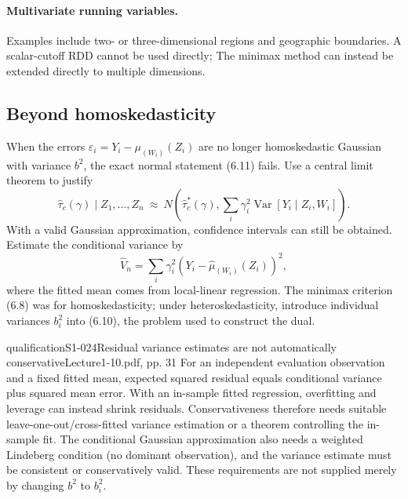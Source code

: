 \paragraph{Multivariate running variables.}
Examples include two- or three-dimensional regions and geographic boundaries. A scalar-cutoff RDD cannot be used directly;  The minimax method can instead be extended directly to multiple dimensions.
\subsection{Beyond homoskedasticity}
When the errors $\varepsilon_i=Y_i-\mu_{(W_i)}(Z_i)$ are no longer homoskedastic Gaussian with variance $b^2$, the exact normal statement (6.11) fails. Use a central limit theorem to justify
\[
\widehat\tau_c(\gamma)\mid Z_1,\ldots,Z_n
\ \approx\ N\left(\widehat\tau_c^*(\gamma),
\sum_i\gamma_i^2\operatorname{Var}[Y_i\mid Z_i,W_i]\right).
\tag{6.14 in the notes}
\]
With a valid Gaussian approximation, confidence intervals can still be obtained. Estimate the conditional variance by
\[
\widehat V_n=\sum_i\gamma_i^2(Y_i-\widehat\mu_{(W_i)}(Z_i))^2,
\]
where the fitted mean comes from local-linear regression.
  The minimax criterion (6.8) was for homoskedasticity; under heteroskedasticity, introduce individual variances $b_i^2$ into (6.10), the problem used to construct the dual.
\begin{reviewnote}{qualification}{S1-024}{Residual variance estimates are not automatically conservative}{Lecture1-10.pdf, pp. 31}
For an independent evaluation observation and a fixed fitted mean, expected squared residual equals conditional variance plus squared mean error. With an in-sample fitted regression, overfitting and leverage can instead shrink residuals. Conservativeness therefore needs suitable leave-one-out/cross-fitted variance estimation or a theorem controlling the in-sample fit. The conditional Gaussian approximation also needs a weighted Lindeberg condition (no dominant observation), and the variance estimate must be consistent or conservatively valid. These requirements are not supplied merely by changing $b^2$ to $b_i^2$.
\end{reviewnote}

